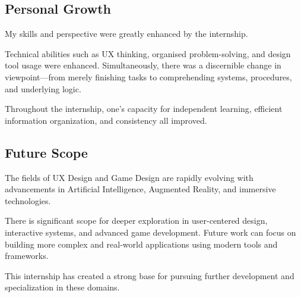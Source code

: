 \documentclass[12pt]{article}
\begin{document}
\subsection{Personal Growth}

My skills and perspective were greatly enhanced by the internship.

Technical abilities such as UX thinking, organised problem-solving, and design tool usage were enhanced. Simultaneously, there was a discernible change in viewpoint—from merely finishing tasks to comprehending systems, procedures, and underlying logic.

Throughout the internship, one's capacity for independent learning, efficient information organization, and consistency all improved.

\subsection{Future Scope}

The fields of UX Design and Game Design are rapidly evolving with advancements in Artificial Intelligence, Augmented Reality, and immersive technologies.

There is significant scope for deeper exploration in user-centered design, interactive systems, and advanced game development. Future work can focus on building more complex and real-world applications using modern tools and frameworks.

This internship has created a strong base for pursuing further development and specialization in these domains.
\end{document}
